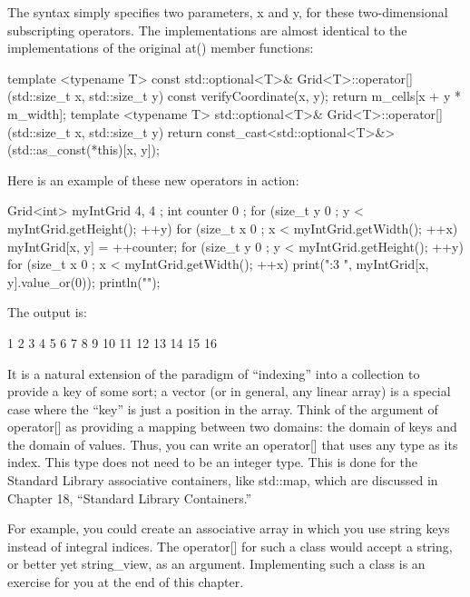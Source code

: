 The syntax simply specifies two parameters, x and y, for these two-dimensional subscripting operators. The implementations are almost identical to the implementations of the original at() member functions:

\begin{cpp}
template <typename T>
const std::optional<T>& Grid<T>::operator[](std::size_t x, std::size_t y) const
{
    verifyCoordinate(x, y);
    return m_cells[x + y * m_width];
}
template <typename T>
std::optional<T>& Grid<T>::operator[](std::size_t x, std::size_t y)
{
    return const_cast<std::optional<T>&>(std::as_const(*this)[x, y]);
}
\end{cpp}

Here is an example of these new operators in action:

\begin{cpp}
Grid<int> myIntGrid { 4, 4 };
int counter { 0 };
for (size_t y { 0 }; y < myIntGrid.getHeight(); ++y) {
    for (size_t x { 0 }; x < myIntGrid.getWidth(); ++x) {
        myIntGrid[x, y] = ++counter;
    }
}
for (size_t y { 0 }; y < myIntGrid.getHeight(); ++y) {
    for (size_t x { 0 }; x < myIntGrid.getWidth(); ++x) {
        print("{:3} ", myIntGrid[x, y].value_or(0));
    }
    println("");
}
\end{cpp}

The output is:

\begin{shell}
 1  2  3  4
 5  6  7  8
 9 10 11 12
13 14 15 16
\end{shell}



It is a natural extension of the paradigm of “indexing” into a collection to provide a key of some sort; a vector (or in general, any linear array) is a special case where the “key” is just a position in the array. Think of the argument of operator[] as providing a mapping between two domains: the domain of keys and the domain of values. Thus, you can write an operator[] that uses any type as its index. This type does not need to be an integer type. This is done for the Standard Library associative containers, like std::map, which are discussed in Chapter 18, “Standard Library Containers.”

For example, you could create an associative array in which you use string keys instead of integral indices. The operator[] for such a class would accept a string, or better yet string\_view, as an argument. Implementing such a class is an exercise for you at the end of this chapter.


